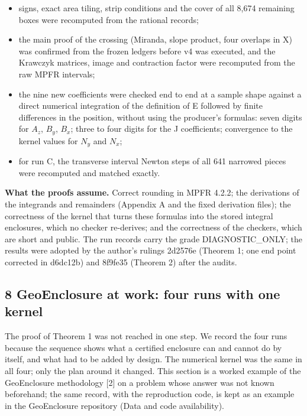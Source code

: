 \documentclass[
  11pt,
]{article}
\providecommand{\tightlist}{%
  \setlength{\itemsep}{0pt}\setlength{\parskip}{0pt}}
\begin{document}
\begin{itemize}
\tightlist
\item
  signs, exact area tiling, strip conditions and the cover of all 8,674
  remaining boxes were recomputed from the rational records;
\item
  the main proof of the crossing (Miranda, slope product, four overlaps
  in X) was confirmed from the frozen ledgers before v4 was executed,
  and the Krawczyk matrices, image and contraction factor were
  recomputed from the raw MPFR intervals;
\item
  the nine new coefficients were checked end to end at a sample shape
  against a direct numerical integration of the definition of E followed
  by finite differences in the position, without using the producer's
  formulas: seven digits for \(A_{z}\), \(B_{y}\), \(B_{x}\); three to
  four digits for the J coefficients; convergence to the kernel values
  for \(N_{y}\) and \(N_{x}\);
\item
  for run C, the transverse interval Newton steps of all 641 narrowed
  pieces were recomputed and matched exactly.
\end{itemize}

\textbf{What the proofs assume.} Correct rounding in MPFR 4.2.2; the
derivations of the integrands and remainders (Appendix A and the fixed
derivation files); the correctness of the kernel that turns these
formulas into the stored integral enclosures, which no checker
re-derives; and the correctness of the checkers, which are short and
public. The run records carry the grade DIAGNOSTIC\_ONLY; the results
were adopted by the author's rulings 2d2576e (Theorem 1; one end point
corrected in d6dc12b) and 8f9fe35 (Theorem 2) after the audits.

\subsection{8 GeoEnclosure at work: four runs with one kernel}

The proof of Theorem 1 was not reached in one step. We record the four
runs because the sequence shows what a certified enclosure can and
cannot do by itself, and what had to be added by design. The numerical
kernel was the same in all four; only the plan around it changed. This
section is a worked example of the GeoEnclosure methodology {[}2{]} on a
problem whose answer was not known beforehand; the same record, with the
reproduction code, is kept as an example in the GeoEnclosure repository
(Data and code availability).
\end{document}
